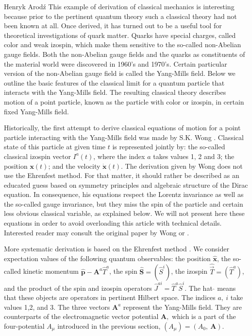 \begin{artengenv}{Henryk Arod\'z}
This example of derivation of classical mechanics is interesting because prior to the pertinent quantum theory such a classical theory had not been known at all. Once derived, it has turned out to be a useful tool for theoretical investigations of quark matter. Quarks have special charges, called color and weak izospin, which make them sensitive to the so-called non-Abelian gauge fields. Both the non-Abelian gauge fields and the quarks as constituents of the material world were discovered in 1960's and 1970's. Certain particular
version of the non-Abelian gauge field is called the Yang-Mills field. Below we outline the basic features of the classical limit for a quantum particle that interacts with the Yang-Mills field. The resulting classical theory describes motion of a point particle, known as the particle with color or izospin, in certain fixed Yang-Mills field.

Historically, the first attempt to derive classical equations of motion for a point particle interacting with the Yang-Mills field was made by S.K. Wong \parencite*{wong}. 
 Classical state of this particle at given time $t$ is represented jointly by: the so-called classical izospin vector $I^a(t)$, where the index $a$ takes values 1, 2 and 3; the position $\mathbf{x}(t)$; and the velocity $\dot{\mathbf{x}}(t)$. The derivation given by Wong does not use the Ehrenfest method. For that matter, it should rather be described as an educated guess based on symmetry principles and algebraic structure of the Dirac equation. In consequence, his equations respect the Lorentz invariance as well as the so-called gauge invariance, but they miss the spin of the particle and certain less obvious classical variable, as explained below. We will not present here these equations in order to avoid overloading this article with technical details. Interested reader may consult the original paper by Wong \parencite*{wong} or \parencite{aro2}. 


More systematic derivation is based on the Ehrenfest method \parencite{aro2}. We consider expectation values of the following quantum observables: the position $\hat{\mathbf{x}}$, the so-called kinetic momentum $ \hat{\mathbf{p}} - \mathbf{A}^a \hat{T}^a$, the spin $\hat{\mathbf{S}}= (\hat{S}^i)$, the izospin $\hat{\vec{T}}= (\hat{T}^a)$, and the product of the spin and izospin operators $\hat{J}^{ai} = \hat{T}^a \hat{S}^i$. The hat $\hat{}$ means that these objects are operators in pertinent Hilbert space. The indices $a, \:i $ take values 1,2, and 3. The three vectors $\mathbf{A}^a$ represent the Yang-Mills field. They are counterparts of the electromagnetic vector potential $\mathbf{A},$ which is a part of the four-potential $A_{\mu}$ introduced in the previous section, $(A_{\mu}) = ( A_0, \:\mathbf{A})$. 




\end{artengenv}
